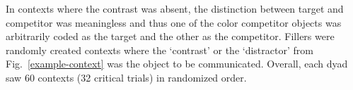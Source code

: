 \documentclass[10pt,letterpaper]{article}
\newcommand{\figref}[1]{Fig.~\ref{#1}}
\begin{document}
In contexts where the contrast was absent, the distinction between target and competitor was meaningless and thus one of the color competitor objects was arbitrarily coded as the target and the other as the competitor. Fillers were randomly created contexts where the `contrast' or the `distractor' from \figref{example-context} was the object to be communicated. Overall, each dyad saw 60 contexts (32 critical trials) in randomized order.


%
%
\end{document}
